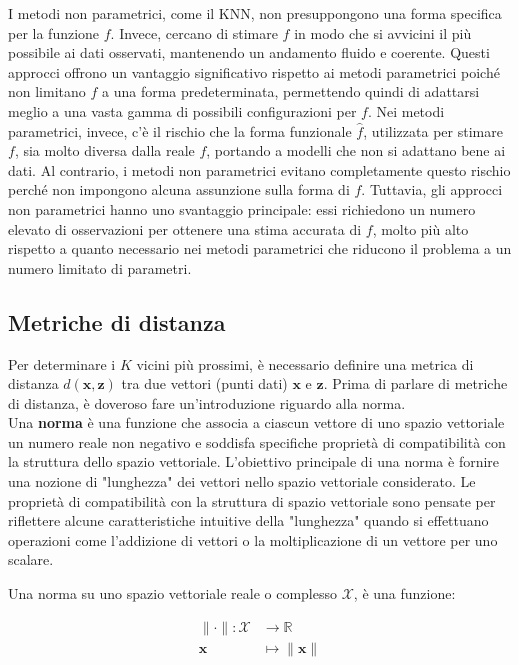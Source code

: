 I metodi non parametrici, come il KNN, non presuppongono una forma 
specifica per la funzione \( f \). Invece, cercano di stimare \( f \) 
in modo che si avvicini il più possibile ai dati osservati, mantenendo 
un andamento fluido e coerente. Questi approcci offrono un vantaggio 
significativo rispetto ai metodi parametrici poiché non limitano \( f \) 
a una forma predeterminata, permettendo quindi di adattarsi meglio a una 
vasta gamma di possibili configurazioni per \( f \). Nei metodi parametrici, 
invece, c'è il rischio che la forma funzionale $\hat{f}$, utilizzata per stimare \( f \), 
sia molto diversa dalla reale \( f \), portando a modelli che non si adattano 
bene ai dati. Al contrario, i metodi non parametrici evitano completamente 
questo rischio perché non impongono alcuna assunzione sulla forma di \( f \). 
Tuttavia, gli approcci non parametrici hanno uno svantaggio principale: 
essi richiedono un numero elevato di osservazioni per ottenere una stima 
accurata di \( f \), molto più alto rispetto a quanto necessario nei metodi 
parametrici che riducono il problema a un numero limitato di parametri.

\subsection{Metriche di distanza}

Per determinare i \( K \) vicini più prossimi, è necessario definire 
una metrica di distanza \( d(\mathbf{x}, \mathbf{z}) \) tra due vettori (punti dati) 
\( \mathbf{x} \) e \( \mathbf{z} \). Prima di parlare di metriche di distanza, è doveroso fare un'introduzione riguardo alla
norma.\\

Una \textbf{norma} è una funzione che associa a ciascun vettore di uno spazio vettoriale un 
numero reale non negativo e soddisfa specifiche proprietà di compatibilità con la 
struttura dello spazio vettoriale. L'obiettivo principale di una norma è fornire una 
nozione di "lunghezza" dei vettori nello spazio vettoriale considerato. Le proprietà di 
compatibilità con la struttura di spazio vettoriale sono pensate per riflettere alcune 
caratteristiche intuitive della "lunghezza" quando si effettuano operazioni come 
l'addizione di vettori o la moltiplicazione di un vettore per uno scalare.

Una norma su uno spazio vettoriale reale o complesso $\mathcal{X}$, è una funzione:

\begin{align*}
\|\cdot\| \colon \mathcal{X} &\to \mathbb{R}\\
\mathbf{x} &\mapsto \|\mathbf{x}\|
\end{align*}


